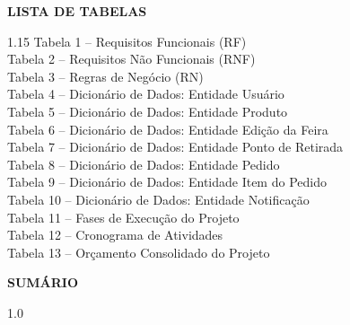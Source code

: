 \documentclass[12pt,a4paper]{article}
\begin{document}
\thispagestyle{empty}
\begin{center}
    {\bfseries\MakeUppercase{Lista de Tabelas}}
\end{center}
\vspace{0.5cm}
\begin{spacing}{1.15}
\noindent Tabela 1 -- Requisitos Funcionais (RF) \\
Tabela 2 -- Requisitos Não Funcionais (RNF) \\
Tabela 3 -- Regras de Negócio (RN) \\
Tabela 4 -- Dicionário de Dados: Entidade Usuário \\
Tabela 5 -- Dicionário de Dados: Entidade Produto \\
Tabela 6 -- Dicionário de Dados: Entidade Edição da Feira \\
Tabela 7 -- Dicionário de Dados: Entidade Ponto de Retirada \\
Tabela 8 -- Dicionário de Dados: Entidade Pedido \\
Tabela 9 -- Dicionário de Dados: Entidade Item do Pedido \\
Tabela 10 -- Dicionário de Dados: Entidade Notificação \\
Tabela 11 -- Fases de Execução do Projeto \\
Tabela 12 -- Cronograma de Atividades \\
Tabela 13 -- Orçamento Consolidado do Projeto 
\end{spacing}
\newpage

\thispagestyle{empty}
\begin{center}
    {\bfseries\MakeUppercase{Sumário}}
\end{center}
\vspace{0.5cm}
\begin{spacing}{1.0}
\tableofcontents
\end{spacing}
\newpage

\setcounter{page}{6}

\end{document}
